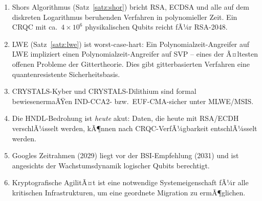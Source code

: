 ﻿\documentclass[a4paper,12pt]{article}
\theoremstyle{definition}
\begin{document}
\begin{enumerate}
\item Shors Algorithmus (Satz~\ref{satz:shor}) bricht RSA, ECDSA und alle
  auf dem diskreten Logarithmus beruhenden Verfahren in polynomieller Zeit.
  Ein CRQC mit ca.\ $4 \times 10^6$ physikalischen Qubits reicht fÃ¼r RSA-2048.

\item LWE (Satz~\ref{satz:lwe}) ist worst-case-hart: Ein Polynomialzeit-Angreifer
  auf LWE impliziert einen Polynomialzeit-Angreifer auf SVP -- eines der Ã¤ltesten
  offenen Probleme der Gittertheorie. Dies gibt gitterbasierten Verfahren
  eine quantenresistente Sicherheitsbasis.

\item CRYSTALS-Kyber und CRYSTALS-Dilithium sind formal bewiesenermaÃŸen
  IND-CCA2- bzw.\ EUF-CMA-sicher unter MLWE/MSIS.

\item Die HNDL-Bedrohung ist \emph{heute} akut: Daten, die heute mit RSA/ECDH
  verschlÃ¼sselt werden, kÃ¶nnen nach CRQC-VerfÃ¼gbarkeit entschlÃ¼sselt werden.

\item Googles Zeitrahmen (2029) liegt vor der BSI-Empfehlung (2031) und
  ist angesichts der Wachstumsdynamik logischer Qubits berechtigt.

\item Kryptografische AgilitÃ¤t ist eine notwendige Systemeigenschaft fÃ¼r
  alle kritischen Infrastrukturen, um eine geordnete Migration zu ermÃ¶glichen.
\end{enumerate}
\end{document}
